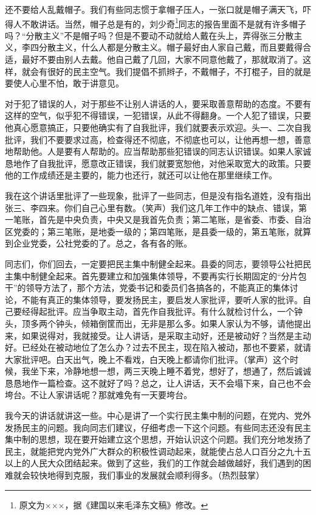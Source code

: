 还不要给人乱戴帽子。我们有些同志惯于拿帽子压人，一张口就是帽子满天飞，吓得人不敢讲话。当然，帽子总是有的，刘少奇\footnote{原文为×××，据《建国以来毛泽东文稿》修改。}同志的报告里面不是就有许多帽子吗？“分散主义”不是帽子吗？但是不要动不动就给人戴在头上，弄得张三分散主义，李四分散主义，什么人都是分散主义。帽子最好由人家自己戴，而且要戴得合适，最好不要由别人去戴。他自己戴了几回，大家不同意他戴了，那就取消了。这样，就会有很好的民主空气。我们提倡不抓辫子，不戴帽子，不打棍子，目的就是要使人心里不怕，敢于讲意见。

对于犯了错误的人，对于那些不让别人讲话的人，要采取善意帮助的态度。不要有这样的空气，似乎犯不得错误，一犯错误，从此不得翻身。一个人犯了错误，只要他真心愿意搞正，只要他确实有了自我批评，我们就要表示欢迎。头一、二次自我批评，我们不要要求过高，检查得还不彻底，不彻底也可以，让他再想一想，善意地帮助他。人是要有人帮助的。应当帮助那些犯错误的同志认识错误。如果人家诚恳地作了自我批评，愿意改正错误，我们就要宽恕他，对他采取宽大的政策。只要他的工作成绩还是主要的，能力也还行，就还可以让他在那里继续工作。

我在这个讲话里批评了一些现象，批评了一些同志，但是没有指名道姓，没有指出张三、李四来。你们自己心里有数。（笑声）我们这几年工作中的缺点、错误，第一笔账，首先是中央负责，中央又是我首先负责；第二笔账，是省委、市委、自治区党委的；第三笔账，是地委一级的；第四笔账，是县委一级的，第五笔账，就算到企业党委，公社党委的了。总之，各有各的账。

同志们，你们回去，一定要把民主集中制健全起来。县委的同志，要领导公社把民主集中制健全起来。首先要建立和加强集体领导，不要再实行长期固定的“分片包干”的领导方法了，那个方法，党委书记和委员们各搞各的，不能真正的集体讨论，不能有真正的集体领导，要发扬民主，要启发人家批评，要听人家的批评。自己要经得起批评。应当争取主动，首先作自我批评。有什么就检讨什么，一个钟头，顶多两个钟头，倾箱倒筐而出，无非是那么多。如果人家认为不够，请他提出来，如果说得对，我就接受。让人讲话，是采取主动好，还是被动好？当然是主动好。已经处在被动地位了怎么办？过去不民主，现在陷入被动，那也不要紧，就请大家批评吧。白天出气，晚上不看戏，白天晚上都请你们批评。（掌声）这个时候，我坐下来，冷静地想一想，两三天晚上睡不着党，想好了，想通了，然后诚诚恳恳地作一篇检查。这不就好了吗？总之，让人讲话，天不会塌下来，自己也不会垮台。不让人家讲话呢？那就难免有一天要垮台。

我今天的讲话就讲这一些。中心是讲了一个实行民主集中制的问题，在党内、党外发扬民主的问题。我向同志们建议，仔细考虑一下这个问题。有些同志还没有民主集中制的思想，现在要开始建立这个思想，开始认识这个问题。我们充分地发扬了民主，就能把党内党外广大群众的积极性调动起来，就能使占总人口百分之九十五以上的人民大众团结起来。做到了这些，我们的工作就会越做越好，我们遇到的困难就会较快地得到克服，我们事业的发展就会顺利得多。（热烈鼓掌）
